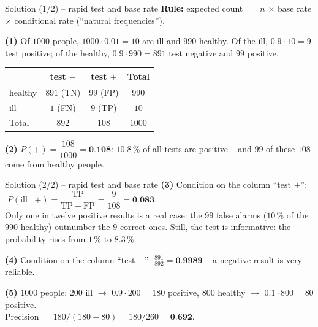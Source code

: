 \documentclass[aspectratio=169,11pt]{beamer}
\begin{document}
\begin{frame}{Solution (1/2) -- rapid test and base rate}
  \textbf{Rule:} expected count $=$ $n$ $\times$ base rate $\times$
  conditional rate (``natural frequencies'').

  \medskip
  \textbf{(1)} Of $1000$ people, $1000\cdot0.01=10$ are ill and $990$
  healthy. Of the ill, $0.9\cdot10=9$ test positive; of the healthy,
  $0.9\cdot990=891$ test negative and $99$ positive.
  \begin{center}
    \renewcommand{\arraystretch}{1.2}
    \begin{tabular}{l|cc|c}
      \toprule
      & test $-$ & test $+$ & Total\\
      \midrule
      healthy & $891$ (TN) & $99$ (FP) & $990$\\
      ill & $1$ (FN) & $9$ (TP) & $10$\\
      \midrule
      Total & $892$ & $108$ & $1000$\\
      \bottomrule
    \end{tabular}
  \end{center}
  \textbf{(2)} $P(+)=\dfrac{108}{1000}=\textbf{0.108}$: $10.8\,\%$ of all tests
  are positive -- and $99$ of these $108$ come from healthy people.
\end{frame}

\begin{frame}{Solution (2/2) -- rapid test and base rate}
  \textbf{(3)} Condition on the column ``test $+$'':
  $\;P(\text{ill}\mid +)=\dfrac{\mathrm{TP}}{\mathrm{TP}+\mathrm{FP}}=\dfrac{9}{108}=\textbf{0.083}$.\\[2pt]
  Only one in twelve positive results is a real case: the $99$ false alarms
  ($10\,\%$ of the $990$ healthy) outnumber the $9$ correct ones. Still, the
  test is informative: the probability rises from $1\,\%$ to $8.3\,\%$.

  \medskip
  \textbf{(4)} Condition on the column ``test $-$'':
  $\frac{891}{892}=\textbf{0.9989}$ -- a negative result is very reliable.

  \medskip
  \textbf{(5)} $1000$ people: $200$ ill $\to$ $0.9\cdot200=180$ positive,
  $800$ healthy $\to$ $0.1\cdot800=80$ positive.\\
  Precision $=180/(180+80)=180/260=\textbf{0.692}$.
\end{frame}
\end{document}
